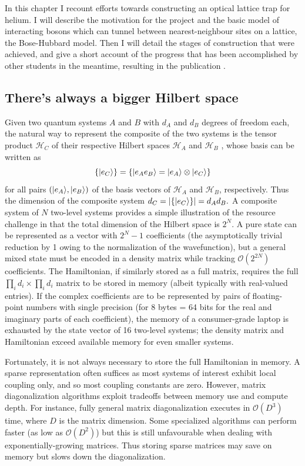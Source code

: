 	In this chapter I recount efforts towards constructing an optical lattice trap for helium.
	I will describe the motivation for the project and the basic model of interacting bosons which can tunnel between nearest-neighbour sites on a lattice, the Bose-Hubbard model.
	Then I will detail the stages of construction that were achieved, and give a short account of the progress that has been accomplished by other students in the meantime, resulting in the publication \cite{Abbas21}.
	
	

\subsection{There's always a bigger Hilbert space}


	Given two quantum systems $A$ and $B$ with $d_A$ and $d_B$ degrees of freedom each, the natural way to represent the composite of the two systems is the tensor product $\mathcal{H}_C$ of their respective Hilbert spaces $\mathcal{H}_A$ and $\mathcal{H}_B$ \cite{Carcassi21}, whose basis can be written as
	\begin{equation}
	\{|e_C\rangle\} = \{|e_A e_B\rangle=|e_A\rangle\otimes|e_C\rangle\}
	\end{equation}
	for all pairs $(|e_A\rangle,|e_B\rangle)$ of the basis vectors of $\mathcal{H}_A$ and $\mathcal{H}_B$, respectively.
	Thus the dimension of the composite system $d_C = |\{|e_C\rangle\}| = d_A d_B.$ A composite system of $N$ two-level systems provides a simple illustration of the resource challenge in that the total dimension of the Hilbert space is $2^N$.
	A pure state can be represented as a vector with $2^N-1$ coefficients (the asymptotically trivial reduction by 1 owing to the normalization of the wavefunction), but a general mixed state must be encoded in a density matrix while tracking $\mathcal{O}(2^{2N})$  coefficients.
	The Hamiltonian, if similarly stored as a full matrix, requires the full $\prod_i d_i\times\prod_i d_i$ matrix to be stored in memory (albeit typically with real-valued entries).
	If the complex coefficients are to be represented by pairs of floating-point numbers with single precision (for 8 bytes = 64 bits for the real and imaginary parts of each coefficient), the memory of a consumer-grade laptop is exhausted by the state vector of 16 two-level systems; the density matrix and Hamiltonian exceed available memory for even smaller systems.

	Fortunately, it is not always necessary to store the full Hamiltonian in memory.
	A sparse representation often suffices as most systems of interest exhibit local coupling only, and so most coupling constants are zero.
	However, matrix diagonalization algorithms exploit tradeoffs between memory use and compute depth.
	For instance, fully general matrix diagonalization executes in $\mathcal{O}(D^{3})$ time, where $D$ is the matrix dimension.
	Some specialized algorithms can perform faster (as low as $\mathcal{O}(D^{2})$) but this is still unfavourable when dealing with exponentially-growing matrices.
	Thus storing sparse matrices may save on memory but slows down the diagonalization.

